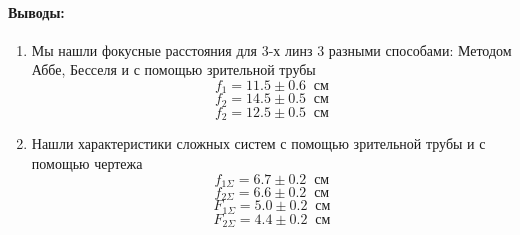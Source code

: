 \documentclass[a4paper,12pt]{article}
\begin{document}
\paragraph{Выводы:}
\begin{enumerate}
\item Мы нашли фокусные расстояния для 3-х линз 3 разными способами: Методом Аббе, Бесселя и с помощью зрительной трубы
\[f_1 = 11.5\pm 0.6\;\;\text{см}\]
\[f_2 = 14.5\pm 0.5\;\;\text{см}\]
\[f_2 = 12.5\pm 0.5\;\;\text{см}\]
\item Нашли характеристики сложных систем с помощью зрительной трубы и с помощью чертежа
\[f_{1\Sigma} = 6.7\pm 0.2\;\;\text{см}\]
\[f_{2\Sigma} = 6.6\pm 0.2\;\;\text{см}\]
\[F_{1\Sigma} = 5.0\pm 0.2\;\;\text{см}\]
\[F_{2\Sigma} = 4.4\pm 0.2\;\;\text{см}\]
\end{enumerate}
\end{document}
